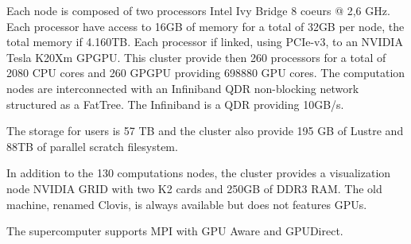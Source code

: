 Each node is composed of two processors Intel Ivy Bridge 8 coeurs @ 2,6 GHz. 
Each processor have access to 16GB of memory for a total of 32GB per node, the total memory if 4.160TB. 
Each processor if linked, using PCIe-v3, to an NVIDIA Tesla K20Xm GPGPU. 
This cluster provide then 260 processors for a total of 2080 CPU cores and 260 GPGPU providing 698880 GPU cores. 
The computation nodes are interconnected with an Infiniband QDR non-blocking network structured as a FatTree. 
The Infiniband is a QDR providing 10GB/s. 

The storage for users is 57 TB and the cluster also provide 195 GB of Lustre and 88TB of parallel scratch filesystem. 

In addition to the 130 computations nodes, the cluster provides a visualization node NVIDIA GRID with two K2 cards and 250GB of DDR3 RAM. 
The old machine, renamed Clovis, is always available but does not features GPUs. 

The supercomputer supports MPI with GPU Aware and GPUDirect. 
